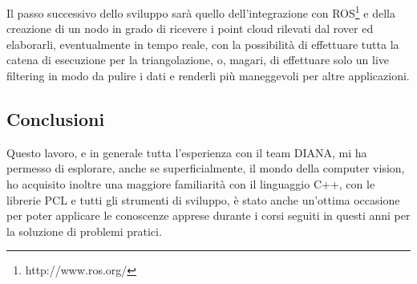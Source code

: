 \documentclass[a4paper,12pt]{article}
\begin{document}
	Il passo successivo dello sviluppo sarà quello dell'integrazione con ROS\footnote{http://www.ros.org/} e della creazione di
	un nodo in grado di ricevere i point cloud rilevati dal rover ed elaborarli, eventualmente in tempo reale, con la
	possibilità di effettuare tutta la catena di esecuzione per la triangolazione, o, magari, di effettuare solo un live
	filtering in modo da pulire i dati e renderli più maneggevoli per altre applicazioni.
	\subsection{Conclusioni}
	Questo lavoro, e in generale tutta l'esperienza con il team DIANA, mi ha permesso di esplorare, anche se superficialmente, 
	il mondo della computer vision, ho acquisito inoltre una maggiore familiarità con il linguaggio C++, con le librerie 
	PCL e tutti gli strumenti di sviluppo, è stato anche un'ottima occasione per poter applicare le conoscenze apprese durante 
	i corsi seguiti in questi anni per la soluzione di problemi pratici.
	   
\end{document}

